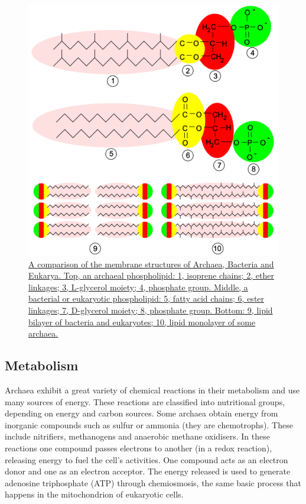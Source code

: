 \begin{figure}

{\centering \includegraphics[width=0.7\linewidth]{./figures/bacteria/Archaea_membrane} 

}

\caption{\href{https://commons.wikimedia.org/wiki/File:Archaea_membrane.svg}{A comparison of the membrane structures of Archaea, Bacteria and Eukarya. Top, an archaeal phospholipid: 1, isoprene chains; 2, ether linkages; 3, L-glycerol moiety; 4, phosphate group. Middle, a bacterial or eukaryotic phospholipid: 5, fatty acid chains; 6, ester linkages; 7, D-glycerol moiety; 8, phosphate group. Bottom: 9, lipid bilayer of bacteria and eukaryotes; 10, lipid monolayer of some archaea.}}\label{fig:membranestruccomp}
\end{figure}

\hypertarget{metabolism-2}{%
\subsection{Metabolism}\label{metabolism-2}}

Archaea exhibit a great variety of chemical reactions in their metabolism and use many sources of energy. These reactions are classified into nutritional groups, depending on energy and carbon sources. Some archaea obtain energy from inorganic compounds such as sulfur or ammonia (they are chemotrophs). These include nitrifiers, methanogens and anaerobic methane oxidisers. In these reactions one compound passes electrons to another (in a redox reaction), releasing energy to fuel the cell's activities. One compound acts as an electron donor and one as an electron acceptor. The energy released is used to generate adenosine triphosphate (ATP) through chemiosmosis, the same basic process that happens in the mitochondrion of eukaryotic cells.

